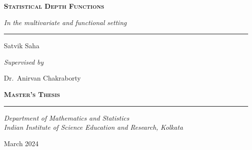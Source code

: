 \begin{titlepage}
    \vspace*{4cm}

    {\noindent\Huge\scshape\bfseries
        Statistical Depth Functions
    }
    \vspace{0.6cm}

    {\noindent\LARGE\itshape
        In the multivariate and functional setting
    }
    \vspace{0.8cm}
    \hrule
    \vspace{0.8cm}

    {\noindent\Large Satvik Saha}
    \vspace{0.6cm}

    {\noindent\Large\itshape Supervised by}
    \vspace{0.2cm}

    {\noindent\Large Dr.~Anirvan Chakraborty}
    \vspace{0.5cm}

    \vfill

    \raggedleft
    {\noindent\large\scshape\bfseries Master's Thesis}
    \vspace{0.1cm}

    \rule{0.5\textwidth}{1pt}

    \vspace{0.2cm}

    {\noindent\large\itshape
        Department of Mathematics and Statistics \\
        Indian Institute of Science Education and Research, Kolkata \\
    }
    \vspace{0.8cm}

    {\noindent\large March 2024}

    \vspace*{1cm}
\end{titlepage}
